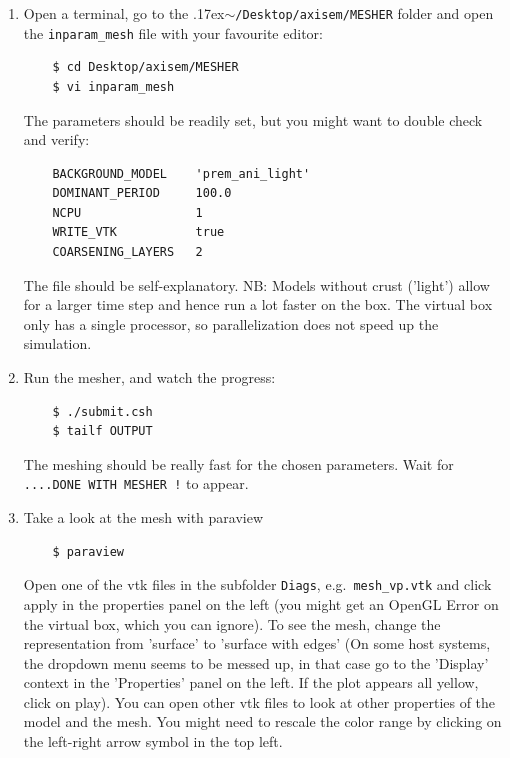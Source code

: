 \documentclass{article}
\newcommand{\ttilde}[0]{\raise.17ex\hbox{$\scriptstyle\sim$}}
\begin{document}
\begin{enumerate}
    \item Open a terminal, go to the \ttilde\verb|/Desktop/axisem/MESHER| folder and open
    the \verb|inparam_mesh| file with your favourite editor:
    \begin{verbatim}
    $ cd Desktop/axisem/MESHER
    $ vi inparam_mesh
    \end{verbatim}
    The parameters should be readily set, but you might want to double check and verify:
    \begin{verbatim}
    BACKGROUND_MODEL    'prem_ani_light'
    DOMINANT_PERIOD     100.0
    NCPU                1
    WRITE_VTK           true
    COARSENING_LAYERS   2
    \end{verbatim}
    The file should be self-explanatory. NB: Models without crust ('light') allow for a
    larger time step and hence run a lot faster on the box. The virtual box only has a
    single processor, so parallelization does not speed up the simulation.

    \item Run the mesher, and watch the progress:
    \begin{verbatim}
    $ ./submit.csh
    $ tailf OUTPUT
    \end{verbatim}
    The meshing should be really fast for the chosen parameters. Wait for 
    \verb|....DONE WITH MESHER !| to appear.

    \item Take a look at the mesh with paraview
    \begin{verbatim}
    $ paraview
    \end{verbatim}
    Open one of the vtk files in the subfolder \verb|Diags|, e.g.\
    \verb|mesh_vp.vtk| and click apply in the properties panel on the left (you
    might get an OpenGL Error on the virtual box, which you can ignore). To see
    the mesh, change the representation from 'surface' to 'surface with edges'
    (On some host systems, the dropdown menu seems to be messed up, in that
    case go to the 'Display' context in the 'Properties' panel on the left. If
    the plot appears all yellow, click on play).  You can open other vtk files
    to look at other properties of the model and the mesh. You might need to
    rescale the color range by clicking on the left-right arrow symbol in the
    top left.


\end{enumerate}
\end{document}
